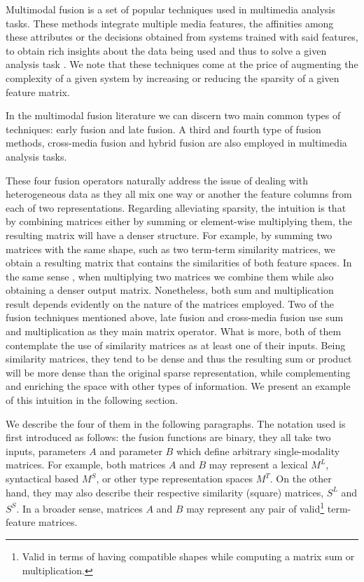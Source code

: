 Multimodal fusion is a set of popular techniques used in multimedia analysis tasks. These methods integrate multiple media features, the affinities among these attributes or the decisions obtained from systems trained with said features, to obtain rich insights about the data being used and thus to solve a given analysis  task \cite{AtreyHEK10}. We note that these techniques come at the price of augmenting the complexity of a given system by increasing or reducing the sparsity of a given feature matrix.


In the multimodal fusion literature we can discern two main common types of techniques: early fusion and late fusion. A third and fourth type of fusion methods, cross-media fusion and hybrid fusion are also employed in multimedia analysis tasks. 

These four fusion operators naturally address the issue of dealing with heterogeneous data as they all mix one way or another the feature columns from each of two representations. Regarding alleviating sparsity, the intuition is that by combining matrices either by summing or element-wise multiplying them, the resulting matrix will have a denser structure. For example, by summing two matrices with the same shape, such as two term-term similarity matrices, we  obtain a resulting matrix that contains the similarities of both feature spaces. In the same sense , when multiplying two matrices we combine them while also obtaining a denser output matrix. Nonetheless, both sum and multiplication result depends evidently on the nature of the matrices employed. Two of the fusion techniques mentioned above, late fusion and cross-media fusion use sum and multiplication as they  main matrix operator. What is more, both of them contemplate the use of similarity matrices as at least one of their inputs. Being similarity matrices, they tend to be dense and thus the resulting sum or product will be more dense than the original sparse representation, while complementing and enriching the space with other types of information. We present an example of this intuition in the following section.


We describe the four of them in the following paragraphs. The notation used is first introduced as follows: the fusion functions are binary, they all take two inputs, parameters $A$ and parameter $B$ which define arbitrary single-modality matrices. For example, both matrices $A$ and $B$ may represent a lexical $M^{L}$, syntactical based $M^{S}$, or other type representation spaces $M^{T}$. On the other hand, they may also describe their  respective similarity (square) matrices, $S^{L}$ and  $S^{S}$. In a broader sense, matrices $A$ and $B$ may represent any pair of valid\footnote{Valid in terms of having compatible shapes while computing a matrix sum or multiplication.} term-feature matrices.



